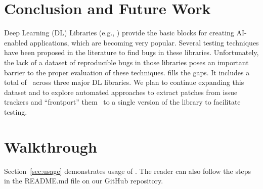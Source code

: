 \documentclass[sigconf,screen]{acmart}
\begin{document}
\section{Conclusion and Future Work}
Deep Learning (DL) Libraries (e.g., \torch) provide the basic blocks
for creating AI-enabled applications, which are becoming very
popular. Several testing techniques have been proposed in the
literature to find bugs in these libraries. Unfortunately, the lack of
a dataset of reproducible bugs in those libraries poses an important
barrier to the proper evaluation of these techniques. \tname{} fills
the gaps. It includes a total of \numbugs\ across three major DL
libraries. We plan to continue expanding this dataset and to explore
automated approaches to extract patches from issue trackers and
``frontport'' them~\cite{hazimeh2020magma} to a single version of the
library to facilitate testing.


\balance



\appendix

\section{Walkthrough}

Section~\ref{sec:usage} demonstrates usage of \tname. The reader can
also follow the steps in the README.md file on our GitHub repository.
\end{document}
